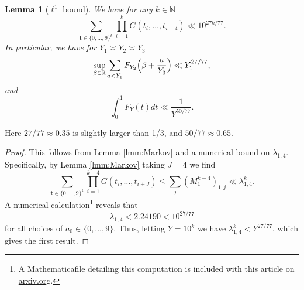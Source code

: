 \documentclass[10pt]{amsart}
\theoremstyle{plain}
\newtheorem{lmm}[thrm]{Lemma}
\numberwithin{sblmm}{thrm}
\numberwithin{equation}{section}
\begin{document}
%
%
%
%
\begin{lmm}[$\ell^1$ bound]\label{lmm:L1Bound}
%
We have for any $k\in\mathbb{N}$
\[
\sum_{\mathbf{t}\in\{0,\dots,9\}^k}\prod_{i=1}^k G(t_i,\dots,t_{i+4})\ll 10^{27k/77}.
\]
In particular, we have for $Y_1\asymp Y_2\asymp Y_3$
\[
\sup_{\beta\in\mathbb{R}}\sum_{a<Y_1}F_{Y_2}\Bigl(\beta+\frac{a}{Y_3}\Bigr)\ll Y_1^{27/77},
\]
and
\[
\int_0^1 F_{Y}(t)d t\ll \frac{1}{Y^{50/77}}. 
\]
%
\end{lmm}
%
%
Here $27/77\approx 0.35$ is slightly larger than 1/3, and $50/77\approx 0.65$.
%
%
%
%
\begin{proof}
%
This follows from Lemma \ref{lmm:Markov} and a numerical bound on $\lambda_{1,4}$. Specifically, by Lemma \ref{lmm:Markov} taking $J=4$ we find
%
\begin{equation}
\sum_{\mathbf{t}\in\{0,\dots,9\}^k}\prod_{i=1}^{k-4} G(t_i,\dots,t_{i+J})\le\sum_{j} (M_1^{k-4})_{1,j}\ll \lambda_{1,4}^{k}.
\label{eq:GL1Bound}
\end{equation}
A numerical calculation\footnote{A Mathematica\textregistered\;file detailing this computation is included with this article on \url{arxiv.org}.} reveals that
\begin{equation}
\lambda_{1,4}< 2.24190< 10^{27/77}
\label{eq:Lambda14Calc}
\end{equation}
for all choices of $a_0\in\{0,\dots,9\}$. Thus, letting $Y=10^k$ we have $\lambda_{1,4}^k<Y^{27/77}$, which gives the first result.  


\end{proof}
\end{document}
